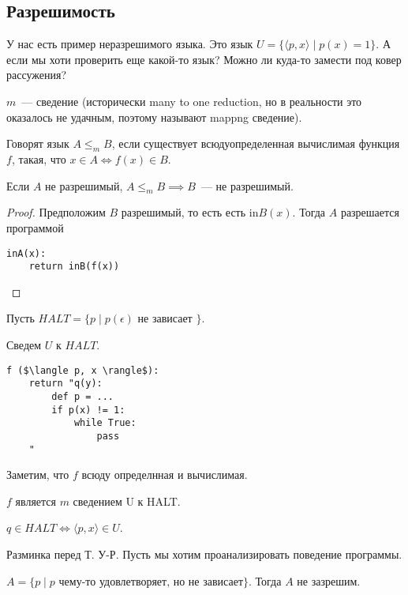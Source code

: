 \subsection{Разрешимость}
У нас есть пример неразрешимого языка. Это язык $U = \{ \langle p, x \rangle \mid p(x) = 1\}$.
А если мы хоти проверить еще какой-то язык? Можно ли куда-то замести под ковер рассужения?

\begin{definition}
    $m$~--- сведение (исторически many to one reduction, но в реальности это оказалось не удачным, поэтому называют mappng сведение).

    Говорят язык $A \leqslant_m B$, если существует всюдуопределенная вычислимая функция $f$, такая, что $x \in A \iff f(x) \in B$.
\end{definition}

\begin{theorem}
    Если $A$ не разрешимый, $A \leqslant_m B \implies B$~--- не разрешимый.
\end{theorem}

\begin{proof}
    Предположим $B$ разрешимый, то есть есть $\mathrm{in} B(x)$.
    Тогда $A$ разрешается программой
\begin{lstlisting}[mathescape=true]
inA(x):
    return inB(f(x))
\end{lstlisting}
\end{proof}

\begin{example}

    Пусть $HALT = \{ p\mid p(\epsilon) \text{ не зависает } \}$.

    Сведем $U$ к $HALT$.
\begin{lstlisting}[mathescape=true]
f ($\langle p, x \rangle$):
    return "q(y):
        def p = ...
        if p(x) != 1:
            while True:
                pass
    "
\end{lstlisting}

Заметим, что $f$ всюду определнная и вычислимая.

$f$ является $m$ сведением U к HALT.

$q \in HALT \iff \langle p, x \rangle \in U$.
\end{example}

Разминка перед Т. У-Р.
Пусть мы хотим проанализировать поведение программы.

$A = \{ p \mid p \text{ чему-то удовлетворяет, но не зависает}\}$.
Тогда $A$ не зазрешим.

